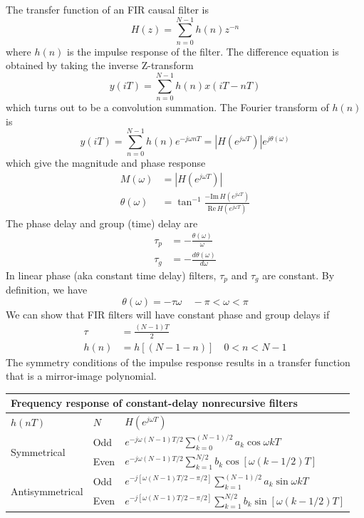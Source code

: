 \documentclass[11pt]{book}
\theoremstyle{example}
\begin{document}
The transfer function of an FIR causal filter is
\begin{equation}
	H(z)=\sum_{n=0}^{N-1}{h(n)z^{-n}}
\end{equation}
where $h(n)$ is the impulse response of the filter. The difference equation is obtained by taking the inverse Z-transform
\begin{equation}
	y(iT)=\sum_{n=0}^{N-1}{h(n)x(iT-nT)}
\end{equation}
which turns out to be a convolution summation.
The Fourier transform of $h(n)$ is
\begin{equation}
	y(iT)=\sum_{n=0}^{N-1}{h(n)e^{-j{\omega}nT}}=|H(e^{j{\omega}T})|e^{j\theta(\omega)}
\end{equation}
which give the magnitude and phase response
\begin{align}
	M(\omega)&=|H(e^{j{\omega}T})|\\
	\theta(\omega)&=\tan^{-1}{\frac{-\mathrm{Im}\,H(e^{j{\omega}T})}{\mathrm{Re}\,H(e^{j{\omega}T})}}
\end{align}
The phase delay and group (time) delay are
\begin{align}
	\tau_p&=-\frac{\theta(\omega)}{\omega}\\
	\tau_g&=-\frac{d\theta(\omega)}{d\omega}
\end{align}
In linear phase (aka constant time delay) filters, $\tau_p$ and $\tau_g$ are constant. By definition, we have
\begin{equation}
	\theta(\omega)=-\tau\omega\quad-\pi<\omega<\pi
\end{equation}
We can show that FIR filters will have constant phase and group delays if
\begin{align}
	\tau&=\frac{(N-1)T}{2}\\
	h(n)&=h[(N-1-n)]\quad{0<n<N-1}
\end{align}
The symmetry conditions of the impulse response results in a transfer function that is a mirror-image polynomial.
\begin{center}
	\begin{tabular}{|l|l|l|}
		\multicolumn{3}{l}{Frequency response of constant-delay nonrecursive filters}\\
		\hline
		$h(nT)$ & $N$ & $H(e^{j{\omega}T})$\\
		\hline
		\multirow{2}{*}{Symmetrical} & Odd & $e^{-j\omega(N-1)T/2}\sum_{k=0}^{(N-1)/2}{a_k\cos{\omega{kT}}}$\\
		\cline{2-3}
		& Even & $e^{-j\omega(N-1)T/2}\sum_{k=1}^{N/2}{b_k\cos{[\omega(k-1/2)T]}}$\\
		\hline
		\multirow{2}{*}{Antisymmetrical} & Odd & $e^{-j[\omega(N-1)T/2-\pi/2]}\sum_{k=1}^{(N-1)/2}{a_k\sin{\omega{kT}}}$\\
		\cline{2-3}
		& Even & $e^{-j[\omega(N-1)T/2-\pi/2]}\sum_{k=1}^{N/2}{b_k\sin{[\omega(k-1/2)T]}}$\\
		\hline
	\end{tabular}
\end{center}
\end{document}
